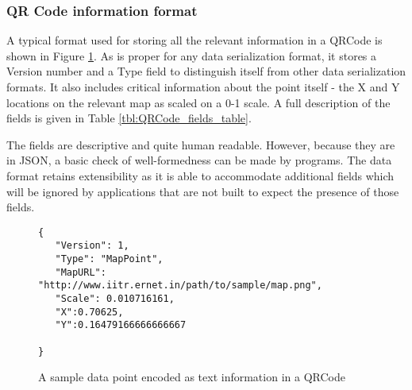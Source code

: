 \subsubsection{QR Code information format}

A typical format used for storing all the relevant information in a QRCode is
shown in Figure \ref{fig:QRCode_info_format}. As is proper for any data 
serialization format, it stores a Version number and a Type field to 
distinguish itself from other data serialization formats. It also includes
critical information about the point itself - the X and Y locations on 
the relevant map as scaled on a 0-1 scale. A full description of the fields
is given in Table \ref{tbl:QRCode_fields_table}.


The fields are descriptive 
and quite human readable. However, because they are in JSON, a basic 
check of well-formedness can be made by programs. The data format retains 
extensibility as it is able to accommodate additional fields which will
be ignored by applications that are not built to expect the presence of those
fields.

\begin{figure}
    \centering
\begin{verbatim}
{
   "Version": 1,
   "Type": "MapPoint",
   "MapURL": "http://www.iitr.ernet.in/path/to/sample/map.png",
   "Scale": 0.010716161,
   "X":0.70625,
   "Y":0.16479166666666667 
   
}
\end{verbatim}
    \caption{A sample data point encoded as text information in a QRCode\label{fig:QRCode_info_format}}
\end{figure}


